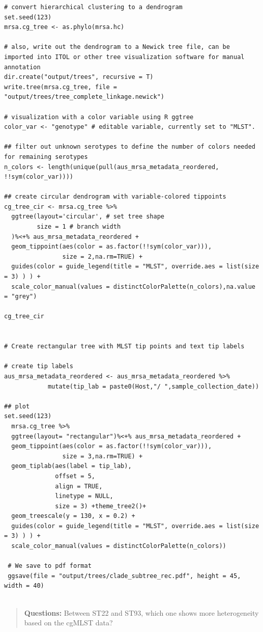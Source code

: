 \documentclass[
]{book}
\begin{document}
\begin{verbatim}
# convert hierarchical clustering to a dendrogram 
set.seed(123)
mrsa.cg_tree <- as.phylo(mrsa.hc)

# also, write out the dendrogram to a Newick tree file, can be imported into ITOL or other tree visualization software for manual annotation
dir.create("output/trees", recursive = T)
write.tree(mrsa.cg_tree, file = "output/trees/tree_complete_linkage.newick")

# visualization with a color variable using R ggtree 
color_var <- "genotype" # editable variable, currently set to "MLST".

## filter out unknown serotypes to define the number of colors needed for remaining serotypes 
n_colors <- length(unique(pull(aus_mrsa_metadata_reordered, !!sym(color_var))))

## create circular dendrogram with variable-colored tippoints
cg_tree_cir <- mrsa.cg_tree %>% 
  ggtree(layout='circular', # set tree shape 
         size = 1 # branch width
  )%<+% aus_mrsa_metadata_reordered +
  geom_tippoint(aes(color = as.factor(!!sym(color_var))),
                size = 2,na.rm=TRUE) +
  guides(color = guide_legend(title = "MLST", override.aes = list(size = 3) ) ) +
  scale_color_manual(values = distinctColorPalette(n_colors),na.value = "grey") 

cg_tree_cir


# Create rectangular tree with MLST tip points and text tip labels

# create tip labels 
aus_mrsa_metadata_reordered <- aus_mrsa_metadata_reordered %>%
            mutate(tip_lab = paste0(Host,"/ ",sample_collection_date))

## plot    
set.seed(123)
  mrsa.cg_tree %>% 
  ggtree(layout= "rectangular")%<+% aus_mrsa_metadata_reordered +
  geom_tippoint(aes(color = as.factor(!!sym(color_var))),
                size = 3,na.rm=TRUE) +
  geom_tiplab(aes(label = tip_lab),  
              offset = 5,
              align = TRUE,
              linetype = NULL,
              size = 3) +theme_tree2()+
  geom_treescale(y = 130, x = 0.2) +
  guides(color = guide_legend(title = "MLST", override.aes = list(size = 3) ) ) +
  scale_color_manual(values = distinctColorPalette(n_colors))
  
 # We save to pdf format
 ggsave(file = "output/trees/clade_subtree_rec.pdf", height = 45, width = 40) 
 
\end{verbatim}

\begin{quote}
\textbf{Questions:} Between ST22 and ST93, which one shows more heterogeneity based on the cgMLST data?
\end{quote}
\end{document}
